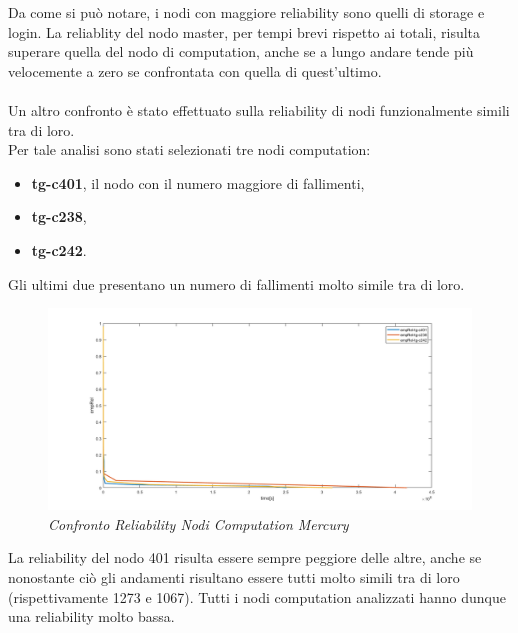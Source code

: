 Da come si può notare, i nodi con maggiore reliability sono quelli di storage e login. La reliablity del nodo master, per tempi brevi rispetto ai totali, risulta superare quella del nodo di computation, anche se a lungo andare tende più velocemente a zero se confrontata con quella di quest'ultimo.
\\
\\
Un altro confronto è stato effettuato sulla reliability di nodi funzionalmente simili tra di loro.
\\Per tale analisi sono stati selezionati tre nodi computation:
\begin{itemize}
	\item \textbf{tg-c401}, il nodo con il numero maggiore di fallimenti,
	\item \textbf{tg-c238},
	\item \textbf{tg-c242}.
\end{itemize}
Gli ultimi due presentano un numero di fallimenti molto simile tra di loro.
\begin{figure}[H]
	\centering
	\includegraphics[width=\textwidth]{img/hw6/RelCompMercury.png}
	\caption{\textit{Confronto Reliability Nodi Computation Mercury}}
\end{figure}
La reliability del nodo 401 risulta essere sempre peggiore delle altre, anche se nonostante ciò gli andamenti risultano essere tutti molto simili tra di loro (rispettivamente 1273 e 1067). Tutti i nodi computation analizzati hanno dunque una reliability molto bassa.
